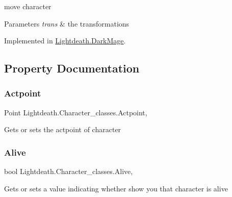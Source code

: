 move character 


\begin{DoxyParams}{Parameters}
{\em trans} & the transformations\\
\hline
\end{DoxyParams}


Implemented in \hyperlink{class_lightdeath_1_1_dark_mage_a5a8c5658cc98b552aa1ae4f7445054d8}{Lightdeath.\+Dark\+Mage}.



\subsection{Property Documentation}
\hypertarget{class_lightdeath_1_1_character__classes_a243b74e07f20085adc67b82a4de165a5}{}\label{class_lightdeath_1_1_character__classes_a243b74e07f20085adc67b82a4de165a5} 
\subsubsection{\texorpdfstring{Actpoint}{Actpoint}}
{\footnotesize\ttfamily Point Lightdeath.\+Character\+\_\+classes.\+Actpoint\hspace{0.3cm}{\ttfamily [get]}, {\ttfamily [set]}}



Gets or sets the actpoint of character 

\hypertarget{class_lightdeath_1_1_character__classes_a5c547899c2120dacbf73452bb91297a7}{}\label{class_lightdeath_1_1_character__classes_a5c547899c2120dacbf73452bb91297a7} 
\subsubsection{\texorpdfstring{Alive}{Alive}}
{\footnotesize\ttfamily bool Lightdeath.\+Character\+\_\+classes.\+Alive\hspace{0.3cm}{\ttfamily [get]}, {\ttfamily [set]}}



Gets or sets a value indicating whether show you that character is alive 

\hypertarget{class_lightdeath_1_1_character__classes_ac2eef720ee351703068b3eebae4c1b67}{}\label{class_lightdeath_1_1_character__classes_ac2eef720ee351703068b3eebae4c1b67} 
